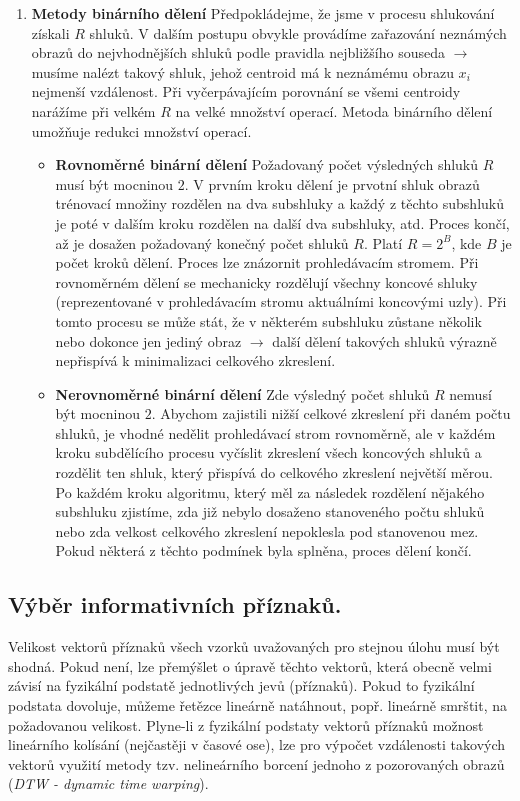 \begin{enumerate}[label=(\Alph*)]
\begin{enumerate}[label=\arabic*.]
\item \textbf{Metody binárního dělení}
Předpokládejme, že jsme v procesu shlukování získali $ R $ shluků. V dalším postupu obvykle provádíme zařazování neznámých obrazů do nejvhodnějších shluků podle pravidla nejbližšího souseda $ \to $ musíme nalézt takový shluk, jehož centroid má k neznámému obrazu $ x_i $ nejmenší vzdálenost. Při vyčerpávajícím porovnání se všemi centroidy narážíme při velkém $ R $ na velké množství operací. Metoda binárního dělení umožňuje redukci množství operací.
\begin{itemize}
\item \textbf{Rovnoměrné binární dělení}
Požadovaný počet výsledných shluků $ R $ musí být mocninou $ 2 $. V prvním kroku dělení je prvotní shluk obrazů trénovací množiny rozdělen na dva subshluky a každý z těchto subshluků je poté v dalším kroku rozdělen na další dva subshluky, atd. Proces končí, až je dosažen požadovaný konečný počet shluků $ R $. Platí $ R = 2^B $, kde $ B $ je počet kroků dělení. Proces lze znázornit prohledávacím stromem. Při rovnoměrném dělení se mechanicky rozdělují všechny koncové shluky (reprezentované v prohledávacím stromu aktuálními koncovými uzly). Při tomto procesu se může stát, že v některém subshluku zůstane několik nebo dokonce jen jediný obraz $ \to $ další dělení takových shluků výrazně nepřispívá k minimalizaci celkového zkreslení.

\item \textbf{Nerovnoměrné binární dělení}
Zde výsledný počet shluků $ R $ nemusí být mocninou $ 2 $. Abychom zajistili nižší celkové zkreslení při daném počtu shluků, je vhodné nedělit prohledávací strom rovnoměrně, ale v každém kroku subdělícího procesu vyčíslit zkreslení všech koncových shluků a rozdělit ten shluk, který přispívá do celkového zkreslení největší měrou. Po každém kroku algoritmu, který měl za následek rozdělení nějakého subshluku zjistíme, zda již nebylo dosaženo stanoveného počtu shluků nebo zda velkost celkového zkreslení nepoklesla pod stanovenou mez. Pokud některá z těchto podmínek byla splněna, proces dělení končí.

\end{itemize}
\end{enumerate}
\end{enumerate}


\subsection{Výběr informativních příznaků.}
Velikost vektorů příznaků všech vzorků uvažovaných pro stejnou úlohu musí být shodná. Pokud není, lze přemýšlet o úpravě těchto vektorů, která obecně velmi závisí na fyzikální podstatě jednotlivých jevů (příznaků). Pokud to fyzikální podstata dovoluje, můžeme řetězce lineárně natáhnout, popř. lineárně smrštit, na požadovanou velikost. Plyne-li z fyzikální podstaty vektorů příznaků možnost lineárního kolísání (nejčastěji v časové ose), lze pro výpočet vzdálenosti takových vektorů využití metody tzv. nelineárního borcení jednoho z pozorovaných obrazů (\textit{DTW - dynamic time warping}).

